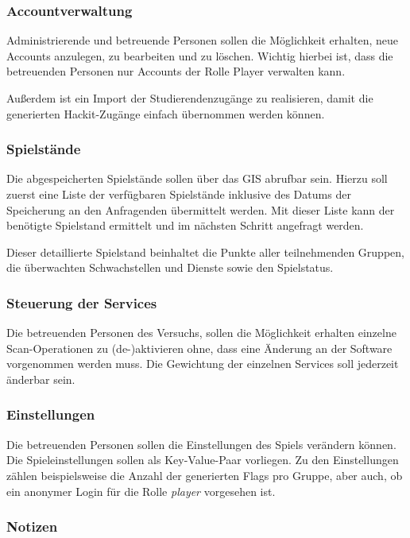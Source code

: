 \subsubsection{Accountverwaltung}

Administrierende und betreuende Personen sollen die Möglichkeit erhalten, neue Accounts anzulegen, zu bearbeiten und zu löschen. Wichtig hierbei ist, dass die betreuenden Personen nur Accounts der Rolle Player verwalten kann.

Außerdem ist ein Import der Studierendenzugänge zu realisieren, damit die generierten Hackit-Zugänge einfach übernommen werden können.

\subsubsection{Spielstände}

Die abgespeicherten Spielstände sollen über das GIS abrufbar sein. Hierzu soll zuerst eine Liste der verfügbaren Spielstände inklusive des Datums der Speicherung an den Anfragenden übermittelt werden. Mit dieser Liste kann der benötigte Spielstand ermittelt und im nächsten Schritt angefragt werden. 

Dieser detaillierte Spielstand beinhaltet die Punkte aller teilnehmenden Gruppen, die überwachten Schwachstellen und Dienste sowie den Spielstatus.

\subsubsection{Steuerung der Services}

Die betreuenden Personen des Versuchs, sollen die Möglichkeit erhalten einzelne \linebreak
Scan-Operationen zu (de-)aktivieren ohne, dass eine Änderung an der Software vorgenommen werden muss. Die Gewichtung der einzelnen Services soll jederzeit änderbar sein.

\subsubsection{Einstellungen}

Die betreuenden Personen sollen die Einstellungen des Spiels verändern können. Die Spieleinstellungen sollen als Key-Value-Paar vorliegen. Zu den Einstellungen zählen beispielsweise die Anzahl der generierten Flags pro Gruppe, aber auch, ob ein anonymer Login für die Rolle \textit{player} vorgesehen ist.

\subsubsection{Notizen}

